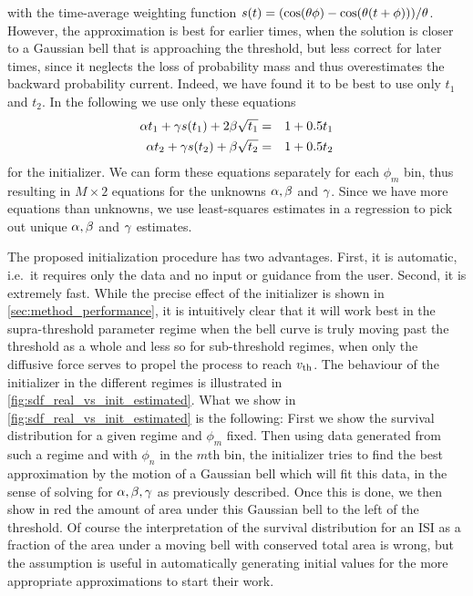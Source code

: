 with the time-average weighting function $s(t) = (\cos({ \theta} \phi)
-\cos({ \theta}(t+\phi)))/{{ \theta}} $. However, the  approximation is best for earlier
times, when the solution is closer to a Gaussian bell that is approaching the
threshold, but less correct for later times, since it neglects the loss of
probability mass and thus overestimates the backward probability current.
Indeed, we have found it to be best to use only $t_1$ and $t_2$. In the
following we use only these equations
\begin{eqnarray*}
\alpha t_1 + {\gamma } s(t_1) + 2\beta \sqrt{t_1}
&=& 1 + 0.5 t_1
\\
\alpha t_2 + {\gamma } s(t_2) + \beta \sqrt{t_2}
&=& 1 + 0.5 t_2 
\end{eqnarray*}
for the initializer.
We can form these equations separately for each $\phi_m$ bin, thus
resulting in $M \times 2$ equations for the unknowns $\alpha, \beta$ and ${\gamma }$. Since
we have more equations than unknowns, we use least-squares estimates in a
regression to pick out unique $\alpha,\beta$ and ${\gamma }$ estimates. 

The proposed initialization procedure has two advantages. First, it is
automatic, i.e.\ it requires only the data and no input or  guidance from the
user. Second, it is extremely fast. While the precise effect of the initializer
is shown in \cref{sec:method_performance}, it is intuitively clear that it will
work best in the supra-threshold parameter regime when the bell curve is truly
moving past the threshold as a whole and less so for sub-threshold regimes, when
only the diffusive force serves to propel the process to reach ${ v_{\textrm{th} } }$. The
behaviour of the initializer in the different regimes is illustrated in
\cref{fig:sdf_real_vs_init_estimated}. What we show in
\cref{fig:sdf_real_vs_init_estimated} is the following: First we show the
survival distribution for a given regime and $\phi_m$ fixed. Then using data
generated from such a regime and with $\phi_n$ in the $m$th bin, the initializer
tries to find the best approximation by the motion of a Gaussian bell which will
fit this data, in the sense of solving for $\alpha,\beta,{\gamma }$ as previously described.
Once this is done, we then show in red the amount of area under this Gaussian
bell to the left of the threshold. Of course the interpretation of the survival
distribution for an ISI as a fraction of the area under a moving bell with
conserved total area is wrong, but the assumption is useful in automatically
generating initial values for the more appropriate approximations to start their
work.

